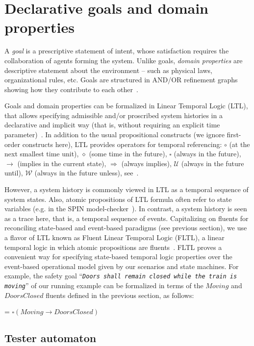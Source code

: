 \section{Declarative goals and domain properties\label{section:background-goals}}

A \emph{goal} is a prescriptive statement of intent, whose satisfaction requires the collaboration of agents forming the system. Unlike goals, \emph{domain properties} are descriptive statement about the environment -- such as physical laws, organizational rules, etc. Goals are structured in AND/OR refinement graphs showing how they contribute to each other~\cite{VanLamsweerde:2000}.

Goals and domain properties can be formalized in Linear Temporal Logic (LTL), that allows specifying admissible and/or proscribed system histories in a declarative and implicit way (that is, without requiring an explicit time parameter)~\cite{VanLamsweerde:2009}. In addition to the usual propositional constructs (we ignore first-order constructs here), LTL provides operators for temporal referencing: $\circ$ (at the next smallest time unit), $\diamond$ (some time in the future), $\square$ (always in the future), $\rightarrow$ (implies in the current state), $\Rightarrow$ (always implies), $\mathcal{U}$ (always in the future until), $\mathcal{W}$ (always in the future unless), see~\cite{Manna:1992}.

However, a system history is commonly viewed in LTL as a temporal sequence of system states. Also, atomic propositions of LTL formula often refer to state variables (e.g. in the SPIN model-checker~\cite{Holzmann:1997}). In contrast, a system history is seen as a trace here, that is, a temporal sequence of events. Capitalizing on fluents for reconciling state-based and event-based paradigms (see previous section), we use a flavor of LTL known as Fluent Linear Temporal Logic (FLTL), a linear temporal logic in which atomic propositions are fluents~\cite{Giannakopoulou:2003}. FLTL proves a convenient way for specifying state-based temporal logic properties over the event-based operational model given by our scenarios and state machines. For example, the safety goal ``\emph{\texttt{Doors shall remain closed while the train is moving}}'' of our running example can be formalized in terms of the $Moving$ and $DoorsClosed$ fluents defined in the previous section, as follows:

\begin{center}
 = $\square(Moving \rightarrow DoorsClosed)$
\end{center}

\subsection{Tester automaton}

